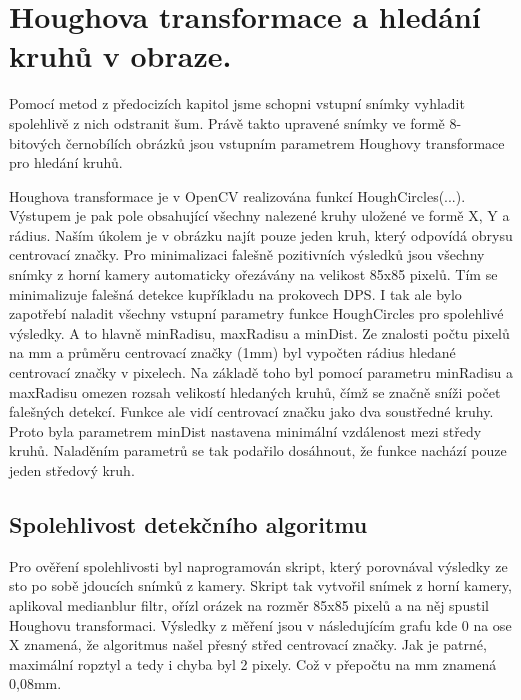 \section{Houghova transformace a  hledání kruhů v obraze.}

Pomocí metod z předocizích kapitol jsme schopni vstupní snímky vyhladit spolehlivě z nich odstranit šum. Právě takto upravené snímky ve formě 8-bitových černobílích obrázků jsou vstupním parametrem Houghovy transformace pro hledání kruhů.

Houghova transformace je v OpenCV realizována funkcí HoughCircles(...). Výstupem je pak pole obsahující všechny nalezené kruhy uložené ve formě X, Y a rádius. Naším úkolem je v obrázku najít pouze jeden kruh, který odpovídá obrysu centrovací značky. Pro minimalizaci falešně pozitivních výsledků jsou všechny snímky z horní kamery automaticky ořezávány na velikost 85x85 pixelů. Tím se minimalizuje falešná detekce kupříkladu na prokovech DPS. I tak ale bylo zapotřebí naladit všechny vstupní parametry funkce HoughCircles pro spolehlivé výsledky. A to hlavně minRadisu, maxRadisu a minDist. Ze znalosti počtu pixelů na mm a průměru centrovací značky (1mm) byl vypočten rádius hledané centrovací značky v pixelech. Na základě toho byl pomocí parametru minRadisu a maxRadisu omezen rozsah velikostí hledaných kruhů, čímž se značně sníži počet falešných detekcí. Funkce ale vidí centrovací značku jako dva soustředné kruhy. Proto byla parametrem minDist nastavena minimální vzdálenost mezi středy kruhů. Naladěním parametrů se tak podařilo dosáhnout, že funkce nachází pouze jeden středový kruh.




\subsection{Spolehlivost detekčního algoritmu}
Pro ověření spolehlivosti byl naprogramován skript, který porovnával výsledky ze sto po sobě jdoucích snímků z kamery. Skript tak vytvořil snímek z horní kamery, aplikoval medianblur filtr, ořízl orázek na rozměr 85x85 pixelů a na něj spustil Houghovu transformaci. Výsledky z měření jsou v následujícím grafu kde 0 na ose X znamená, že algoritmus našel přesný střed centrovací značky. Jak je patrné, maximální ropztyl a tedy i chyba byl 2 pixely. Což v přepočtu na mm znamená 0,08mm. 

